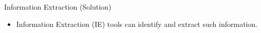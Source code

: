 \documentclass[xcolor=dvipsnames]{beamer}
\begin{document}
\begin{frame}{Information Extraction (Solution)}  
\begin{itemize}
	\item Information Extraction (IE) tools can identify and extract such information.
	\bigskip	
	\begin{center}
	\end{center}	
\end{itemize}
\end{frame}
\end{document}
